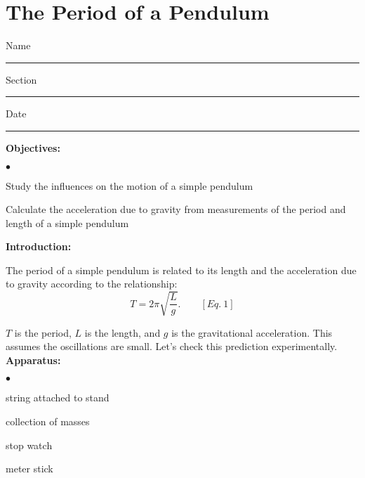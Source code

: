 
\section{The Period of a Pendulum}

Name \rule{2.0in}{0.1pt}\hfill{}Section \rule{1.0in}{0.1pt}\hfill{}Date \rule{1.0in}{0.1pt}

{\noindent \bf Objectives:} \begin{list}{$\bullet$}{\itemsep0pt }

\item Study the influences on the motion of a simple pendulum \item Calculate the acceleration due to gravity from measurements of the period and length of a simple pendulum

\end{list}

{\noindent \bf Introduction:}

\noindent The period of a simple pendulum is related to its length and the acceleration due to gravity according to the relationship:
\[
T=2\pi \sqrt{\frac{L}{g}}.\qquad [Eq.\: 1]\]

\noindent $T$ is the period, $L$ is the length, and $g$ is the gravitational acceleration. This assumes the oscillations are small. Let's check this prediction experimentally. \\

{\noindent \bf Apparatus:} \begin{list}{$\bullet$}{\itemsep0pt }

\item string attached to stand \item collection of masses \item stop watch \item meter stick

\end{list}

